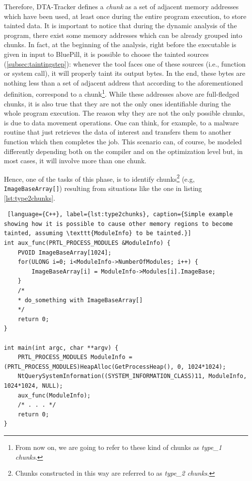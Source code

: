 \documentclass[LaM,binding=0.6cm]{sapthesis}
\begin{document}
\smallskip
Therefore, {\sf DTA-Tracker} defines a \textit{chunk} as a set of adjacent memory addresses which have been used, at least once during the entire program execution, to store tainted data. It is important to notice that during the dynamic analysis of the program, there exist some memory addresses which can be already grouped into chunks. In fact, at the beginning of the analysis, right before the executable is given in input to BluePill, it is possible to choose the tainted sources (\autoref{subsec:taintingstep}): whenever the tool faces one of these sources (i.e., function or system call), it will properly taint its output bytes. In the end, these bytes are nothing less than a set of adjacent address that according to the aforementioned definition, correspond to a chunk\footnote{From now on, we are going to refer to these kind of chunks as \textit{type\_1 chunks}.}.
While these addresses above are full-fledged chunks, it is also true that they are not the only ones identifiable during the whole program execution. The reason why they are not the only possible chunks, is due to data movement operations. One can think, for example, to a malware routine that just retrieves the data of interest and transfers them to another function which then completes the job. This scenario can, of course, be modeled differently depending both on the compiler and on the optimization level but, in most cases, it will involve more than one chunk.

Hence, one of the tasks of this phase, is to identify chunks\footnote{Chunks constructed in this way are referred to as \textit{type\_2 chunks}.} (e.g, \texttt{ImageBaseArray[]}) resulting from situations like the one in listing \ref{lst:type2chunks}.

\begin{lstlisting} [language={C++}, label={lst:type2chunks}, caption={Simple example showing how it is possible to cause other memory regions to become tainted, assuming \texttt{ModuleInfo} to be tainted.}]
int aux_func(PRTL_PROCESS_MODULES &ModuleInfo) {
	PVOID ImageBaseArray[1024];
	for(ULONG i=0; i<ModuleInfo->NumberOfModules; i++) {
		ImageBaseArray[i] = ModuleInfo->Modules[i].ImageBase;
	}
	/*
	* do_something with ImageBaseArray[]
	*/
	return 0;
}

int main(int argc, char **argv) {
	PRTL_PROCESS_MODULES ModuleInfo = (PRTL_PROCESS_MODULES)HeapAlloc(GetProcessHeap(), 0, 1024*1024);
	NtQuerySystemInformation((SYSTEM_INFORMATION_CLASS)11, ModuleInfo, 1024*1024, NULL);
	aux_func(ModuleInfo);
	/* . . . */
	return 0;
}

\end{lstlisting}
\end{document}

